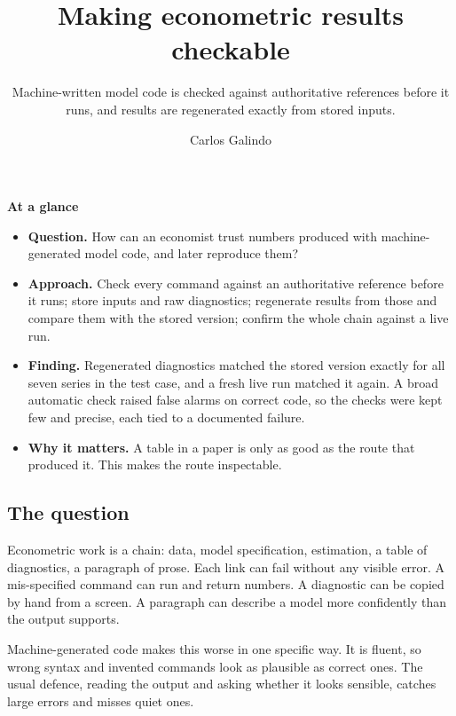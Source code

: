 \documentclass[
  british,
  a4paper,
]{article}
\title{Making econometric results checkable}
\subtitle{Machine-written model code is checked against authoritative
references before it runs, and results are regenerated exactly from
stored inputs.}
\author{Carlos Galindo}
\date{}
\providecommand{\tightlist}{%
  \setlength{\itemsep}{0pt}\setlength{\parskip}{0pt}}
\begin{document}
\maketitle


\begin{tcolorbox}[enhanced jigsaw, arc=.35mm, bottomrule=.15mm, breakable, colback=white, colframe=quarto-callout-note-color-frame, left=2mm, leftrule=.75mm, opacityback=0, rightrule=.15mm, toprule=.15mm]

\vspace{-3mm}\textbf{At a glance}\vspace{3mm}

\begin{itemize}
\tightlist
\item
  \textbf{Question.} How can an economist trust numbers produced with
  machine-generated model code, and later reproduce them?
\item
  \textbf{Approach.} Check every command against an authoritative
  reference before it runs; store inputs and raw diagnostics; regenerate
  results from those and compare them with the stored version; confirm
  the whole chain against a live run.
\item
  \textbf{Finding.} Regenerated diagnostics matched the stored version
  exactly for all seven series in the test case, and a fresh live run
  matched it again. A broad automatic check raised false alarms on
  correct code, so the checks were kept few and precise, each tied to a
  documented failure.
\item
  \textbf{Why it matters.} A table in a paper is only as good as the
  route that produced it. This makes the route inspectable.
\end{itemize}

\end{tcolorbox}

\subsection{The question}\label{the-question}

Econometric work is a chain: data, model specification, estimation, a
table of diagnostics, a paragraph of prose. Each link can fail without
any visible error. A mis-specified command can run and return numbers. A
diagnostic can be copied by hand from a screen. A paragraph can describe
a model more confidently than the output supports.

Machine-generated code makes this worse in one specific way. It is
fluent, so wrong syntax and invented commands look as plausible as
correct ones. The usual defence, reading the output and asking whether
it looks sensible, catches large errors and misses quiet ones.
\end{document}

